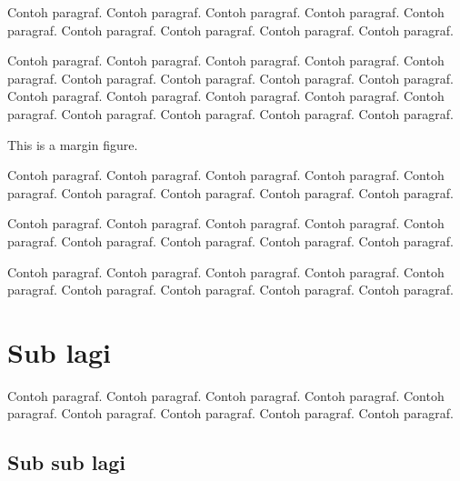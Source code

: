 \documentclass[a4paper,twoside,bahasa,nobib]{tufte-book}
\begin{document}
Contoh paragraf. Contoh paragraf. Contoh paragraf. Contoh paragraf.
Contoh paragraf. Contoh paragraf. Contoh paragraf. Contoh paragraf.
Contoh paragraf.

Contoh paragraf. Contoh paragraf. Contoh paragraf. Contoh paragraf.
Contoh paragraf. Contoh paragraf. Contoh paragraf. Contoh paragraf.
Contoh paragraf.
Contoh paragraf. Contoh paragraf. Contoh paragraf. Contoh paragraf.
Contoh paragraf. Contoh paragraf. Contoh paragraf. Contoh paragraf.
Contoh paragraf.

\begin{marginfigure}
\caption{This is a margin figure.}
\label{fig:marginfig}
\end{marginfigure}

Contoh paragraf. Contoh paragraf. Contoh paragraf. Contoh paragraf.
Contoh paragraf. Contoh paragraf. Contoh paragraf. Contoh paragraf.
Contoh paragraf.

Contoh paragraf. Contoh paragraf. Contoh paragraf. Contoh paragraf.
Contoh paragraf. Contoh paragraf. Contoh paragraf. Contoh paragraf.
Contoh paragraf.

Contoh paragraf. Contoh paragraf. Contoh paragraf. Contoh paragraf.
Contoh paragraf. Contoh paragraf. Contoh paragraf. Contoh paragraf.
Contoh paragraf.

\section{Sub lagi}

Contoh paragraf. Contoh paragraf. Contoh paragraf. Contoh paragraf.
Contoh paragraf. Contoh paragraf. Contoh paragraf. Contoh paragraf.
Contoh paragraf.

\subsection{Sub sub lagi}
\end{document}
